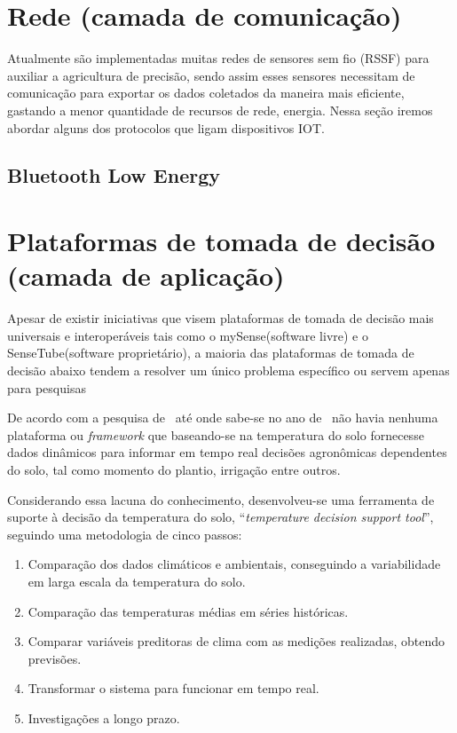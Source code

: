 \documentclass[
article,			%
12pt,				%
oneside,			%
a4paper,			%
english,			%
brazil,				%
sumario=tradicional
]{abntex2}
\begin{document}
\section{Rede (camada de comunicação)}\label{Rede (camada de comunicação)}

Atualmente são implementadas muitas redes de sensores sem fio (RSSF) para auxiliar a agricultura de precisão\cite{6}, sendo assim esses sensores necessitam de comunicação para exportar os dados coletados da maneira mais eficiente, gastando a menor quantidade de recursos de rede, energia\cite{5}. Nessa seção iremos abordar alguns dos protocolos que ligam dispositivos IOT.

\subsection{Bluetooth Low Energy}\label{Bluetooth Low Energy}

\section{Plataformas de tomada de decisão (camada de aplicação)}\label{Plataformas de tomada de decisão}

Apesar de existir iniciativas que visem plataformas de tomada de decisão mais universais e interoperáveis tais como o mySense\cite{7}(software livre) e o SenseTube\cite{6}(software proprietário), a maioria das plataformas de tomada de decisão abaixo tendem a resolver um único problema específico ou servem apenas para pesquisas





De acordo com a pesquisa de~\citeauthor{1} até onde sabe-se no ano de~\citeyear{1} não havia nenhuma plataforma ou \textit{framework} que baseando-se na temperatura do solo fornecesse dados dinâmicos para informar em tempo real decisões agronômicas dependentes do solo, tal como momento do plantio, irrigação entre outros.

Considerando essa lacuna do conhecimento, desenvolveu-se uma ferramenta de suporte à decisão da temperatura do solo, ``\textit{temperature decision support tool}'', seguindo uma metodologia de cinco passos:
\begin{enumerate}
  \item Comparação dos dados climáticos e ambientais, conseguindo a variabilidade em larga escala da temperatura do solo.

  \item Comparação das temperaturas médias em séries históricas.
  \item Comparar variáveis preditoras de clima com as medições realizadas, obtendo previsões.
  \item Transformar o sistema para funcionar em tempo real.
  \item Investigações a longo prazo.
\end{enumerate}
\end{document}
